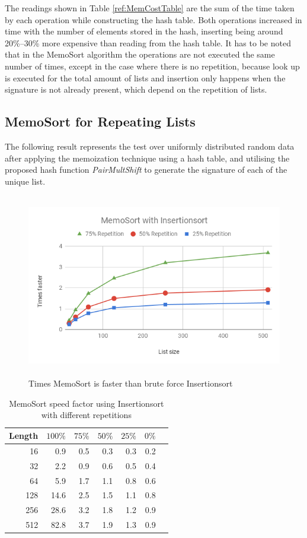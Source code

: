\documentclass[a4paper,12pt]{article}
\begin{document}
The readings shown in Table \ref{ref:MemCostTable} are the sum of the time taken by each operation while constructing the hash table. Both operations increased in time with the number of elements stored in the hash, inserting being around 20\%--30\% more expensive than reading from the hash table. It has to be noted that in the MemoSort algorithm the operations are not executed the same number of times, except in the case where there is no repetition, because look up is executed for the total amount of lists and insertion only happens when the signature is not  already present, which depend on the repetition of lists.

\subsection{MemoSort for Repeating Lists}

The following result represents the test over uniformly distributed random data after applying the memoization technique using a hash table, and utilising the proposed hash function {\it PairMultShift}  to generate the signature of each of the unique list. \\

\begin{figure}[H]
    \centering
    \includegraphics[height=8cm,keepaspectratio]{./images/MemoSortIns.png}
    \caption{Times MemoSort is faster than brute force Insertionsort }
    \label{fig:MemoSortInsGraph}
\end{figure}

\begin{table}[H]
\centering
\begin{tabular}{|r|r|r|r|r|r|r|}   \hline
	{Length}  & {$100\%$} & {$75\%$} & {$50\%$} & {$25\%$} & {$0\%$} \\  \hline
	16  &0.9& 0.5 & 0.3  & 0.3 &  0.2 \\ 
	32 & 2.2 & 0.9 & 0.6 &  0.5 & 0.4 \\ 
	64 &  5.9 & 1.7 & 1.1 & 0.8 & 0.6 \\ 
	128 &14.6 & 2.5 & 1.5 & 1.1  & 0.8 \\ 
	256 & 28.6& 3.2 & 1.8 & 1.2 & 0.9 \\ 
	512 & 82.8& 3.7 & 1.9 & 1.3 & 0.9 \\  \hline
\end{tabular}
\caption{MemoSort speed factor using Insertionsort with different repetitions}
\label{fig:MemoSortInsTable}
\end{table}
\end{document}
